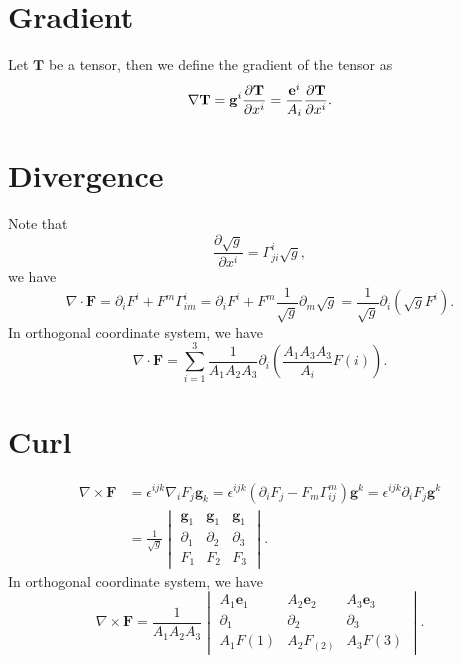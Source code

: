 \documentclass{article}
\theoremstyle{1}
\theoremstyle{2}
\newcommand{\pa}{\partial}
\begin{document}
\section{Gradient}
Let $\mathbf{T}$ be a tensor, then we define the gradient of the tensor as
\begin{equation}
    \nabla \mathbf{T}=\mathbf{g}^i\pdv{\mathbf{T}}{x^i}=\frac{\mathbf{e}^i}{A_i}\pdv{\mathbf{T}}{x^i}.
\end{equation}



\section{Divergence}
Note that 
\begin{equation}
    \frac{\pa \sqrt{g}}{\pa x^i}=\Gamma_{ji}^i\sqrt{g},
\end{equation}
we have 
\begin{equation}
    \nabla\cdot\mathbf{F}=\pa_i F^i+F^m\Gamma_{im}^i=\pa_i F^i+ F^m\frac{1}{\sqrt{g}}\pa _m\sqrt{g}=\frac{1}{\sqrt{g}}\pa_i\left(\sqrt{g}F^i\right).
\end{equation}
In orthogonal coordinate system, we have
\begin{equation}
    \nabla\cdot\mathbf{F}=\sum_{i=1}^3\frac{1}{A_1A_2A_3}\pa_i\left(\frac{A_1A_3A_3}{A_i}F(i)\right).
\end{equation}



\section{Curl}
\begin{align}
    \nabla\times \mathbf{F}&=\epsilon^{ijk}\nabla_i F_j\mathbf{g}_k=\epsilon^{ijk}\left(\pa_i F_j-F_m\Gamma_{ij}^m\right)\mathbf{g}^k=\epsilon^{ijk}\pa_iF_j\mathbf{g}^k\\
    &=\frac{1}{\sqrt{g}}\begin{vmatrix}
 \mathbf{g}_1  & \mathbf{g}_1 &\mathbf{g}_1 \\
 \partial _1 & \partial _2 &\partial _3 \\
 F_1 & F_2 &F_3
\end{vmatrix}.
\end{align}
In orthogonal coordinate system, we have
\begin{equation}
    \nabla\times \mathbf{F}=\frac{1}{A_1A_2A_3} \begin{vmatrix}
 A_1\mathbf{e}_1  & A_2\mathbf{e}_2 &A_3\mathbf{e}_3 \\
 \partial _1 & \partial _2 &\partial _3 \\
 A_1F(1) & A_2F_(2) &A_3F(3)
\end{vmatrix}.
\end{equation}
\end{document}
